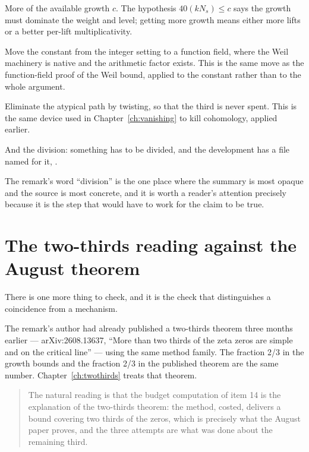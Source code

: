 \begin{description}[style=nextline,leftmargin=0pt,labelwidth=0pt,labelsep=0pt,font=\sffamily\bfseries\small,
  itemsep=6pt]
\item[``Get a main term.'] More of the available growth $c$. The hypothesis
$40(kN_s) \le c$ says the growth must dominate the weight and level; getting
more growth means either more lifts or a better per-lift multiplicativity.
\item[``Transfer constant to a function field.'] Move the constant from the
integer setting to a function field, where the Weil machinery is native and
the arithmetic factor exists. This is the same move as the function-field
proof of the Weil bound, applied to the constant rather than to the whole
argument.
\item[``Kill via twisting.'] Eliminate the atypical path by twisting, so that
the third is never spent. This is the same device used in
Chapter~\ref{ch:vanishing} to kill cohomology, applied earlier.
\item[``Division.''] And the division: something has to be divided, and the
development has a file named for it,
.
\end{description}

The remark's word ``division'' is the one place where the summary is most
opaque and the source is most concrete, and it is worth a reader's attention
precisely because it is the step that would have to work for the claim to be
true.

\section{The two-thirds reading against the August theorem}There is one more thing to check, and it is the check that distinguishes a
coincidence from a mechanism.

The remark's author had already published a two-thirds theorem three months
earlier --- arXiv:2608.13637, ``More than two thirds of the zeta zeros are
simple and on the critical line'' --- using the same method family. The
fraction 2/3 in the growth bounds and the fraction 2/3 in the published
theorem are the same number. Chapter~\ref{ch:twothirds} treats that theorem.

\begin{quote}
The natural reading is that the budget computation of item 14 is the
explanation of the two-thirds theorem: the method, costed, delivers a bound
covering two thirds of the zeros, which is precisely what the August paper
proves, and the three attempts are what was done about the remaining third.
\end{quote}

